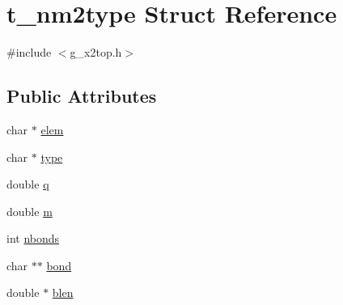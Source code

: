 \hypertarget{structt__nm2type}{\section{t\-\_\-nm2type \-Struct \-Reference}
\label{structt__nm2type}
}


{\ttfamily \#include $<$g\-\_\-x2top.\-h$>$}

\subsection*{\-Public \-Attributes}
\begin{DoxyCompactItemize}
\item 
char $\ast$ \hyperlink{structt__nm2type_ae3a2ee355f7ff022bc37fe074f1bf301}{elem}
\item 
char $\ast$ \hyperlink{structt__nm2type_afd16b6381be327ff490a062cbce1ad0f}{type}
\item 
double \hyperlink{structt__nm2type_a9480c9e3b30e1c9b49b1cf289258cccf}{q}
\item 
double \hyperlink{structt__nm2type_a0e2a333b2cf285d4811820aa28af2afa}{m}
\item 
int \hyperlink{structt__nm2type_acabe54b31afbee39835937ef04d211de}{nbonds}
\item 
char $\ast$$\ast$ \hyperlink{structt__nm2type_a8720761af8e102ca3e8d17660edbc84e}{bond}
\item 
double $\ast$ \hyperlink{structt__nm2type_afe6eb94d819cd56871d65cd6fc5ea77b}{blen}
\end{DoxyCompactItemize}


